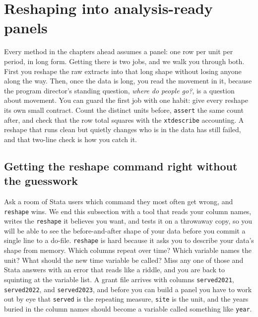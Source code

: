 \section{Reshaping into analysis-ready panels}
Every method in the chapters ahead assumes a panel: one row per unit per period, in long form. Getting there is two jobs, and we walk you through both. First you reshape the raw extracts into that long shape without losing anyone along the way. Then, once the data is long, you read the movement in it, because the program director's standing question, \emph{where do people go?}, is a question about movement. You can guard the first job with one habit: give every reshape its own small contract. Count the distinct units before, \texttt{assert} the same count after, and check that the row total squares with the \texttt{xtdescribe} accounting. A reshape that runs clean but quietly changes who is in the data has still failed, and that two-line check is how you catch it.

\subsection{Getting the reshape command right without the guesswork}\label{sec:ch06-reshapehelper}
Ask a room of Stata users which command they most often get wrong, and \texttt{reshape} wins. We end this subsection with a tool that reads your column names, writes the \texttt{reshape} it believes you want, and tests it on a throwaway copy, so you will be able to see the before-and-after shape of your data before you commit a single line to a do-file. \texttt{reshape} is hard because it asks you to describe your data's shape from memory. Which columns repeat over time? Which variable names the unit? What should the new time variable be called? Miss any one of those and Stata answers with an error that reads like a riddle, and you are back to squinting at the variable list. A grant file arrives with columns \texttt{served2021}, \texttt{served2022}, and \texttt{served2023}, and before you can build a panel you have to work out by eye that \texttt{served} is the repeating measure, \texttt{site} is the unit, and the years buried in the column names should become a variable called something like \texttt{year}.

